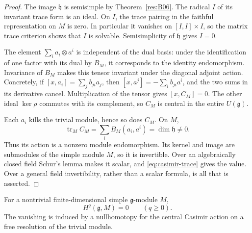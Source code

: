 \begin{proof}
The image \(\mathfrak h\) is semisimple by
Theorem~\ref{res:B06}. The radical \(I\) of its
invariant trace form is an ideal. On \(I\), the
trace pairing in the faithful representation on
\(M\) is zero. In particular it vanishes on
\([I,I]\times I\), so the matrix trace criterion
shows that \(I\) is solvable. Semisimplicity of
\(\mathfrak h\) gives \(I=0\).

The element \(\sum_i a_i\otimes a^i\) is independent
of the dual basis: under the identification of one
factor with its dual by \(B_M\), it corresponds to
the identity endomorphism. Invariance of \(B_M\)
makes this tensor invariant under the diagonal
adjoint action. Concretely, if
\([x,a_i]=\sum_j b_{ji}a_j\), then
\([x,a^j]=-\sum_i b_{ji}a^i\), and the two sums
in its derivative cancel. Multiplication of the
tensor gives
\([x,C_M]=0\).
The other ideal \(\ker\rho\) commutes with its
complement, so \(C_M\) is central in the entire
\(U(\mathfrak g)\).

Each \(a_i\) kills the trivial module, hence so
does \(C_M\). On \(M\),
\[
 \operatorname{tr}_M C_M
 =\sum_i B_M(a_i,a^i)=\dim\mathfrak h\ne0.
 \tag{3.4}\label{eq:casimir-trace}
\]
Thus its action is a nonzero module endomorphism.
Its kernel and image are submodules of the simple
module \(M\), so it is invertible. Over an
algebraically closed field Schur's lemma makes
it scalar, and \eqref{eq:casimir-trace} gives the
value. Over a general field invertibility, rather
than a scalar formula, is all that is asserted.
\end{proof}

\begin{theorem}
\label{res:C03}
For a nontrivial finite-dimensional simple
\(\mathfrak g\)-module \(M\),
\[
 H^q(\mathfrak g,M)=0\qquad(q\geq0).
\]
The vanishing is induced by a nullhomotopy for the
central Casimir action on a free resolution of the
trivial module.
\end{theorem}

